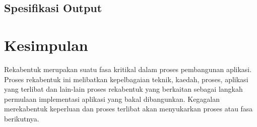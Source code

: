 \subsection{Spesifikasi Output}

\section{Kesimpulan}
Rekabentuk merupakan suatu fasa kritikal dalam proses pembangunan
aplikasi. Proses rekabentuk ini melibatkan kepelbagaian teknik, kaedah,
proses, aplikasi yang terlibat dan lain-lain proses rekabentuk yang berkaitan
sebagai langkah permulaan implementasi aplikasi yang bakal dibangunkan.
Kegagalan merekabentuk keperluan dan proses terlibat akan menyukarkan
proses atau fasa berikutnya.


